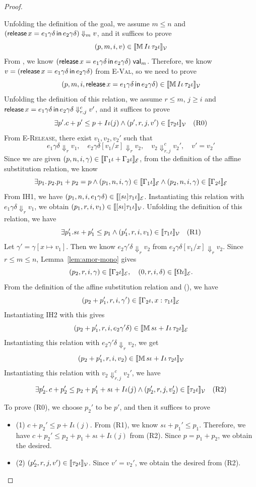 \begin{proof}
\begin{itemize}
Unfolding the definition of the goal, we assume $m\leq n$ and $(\mathsf{release}\, x = e_1\gamma\delta \, \mathsf{in}\, e_2\gamma\delta) \Downarrow_m v$, and it suffices to prove
\[(p, m, i, v) \in \llbracket \mathbb{M}\,{I\iota}\, \tau_2 \iota \rrbracket_{\mathcal{V}} \]
From , we know $(\mathsf{release}\, x = e_1\gamma\delta \, \mathsf{in}\, e_2\gamma\delta)\;\mathsf{val}_{m}$.
Therefore, we know $v= (\mathsf{release}\, x = e_1\gamma\delta \, \mathsf{in}\, e_2\gamma\delta)$ from \textsc{E-Val}, so we need to prove 
\[
(p, m, i, \mathsf{release}\, x = e_1\gamma\delta \, \mathsf{in}\, e_2\gamma\delta) \in \llbracket \mathbb{M}\,{I\iota}\, \tau_2\iota \rrbracket_{\mathcal{V}}
\]
Unfolding the definition of this relation, we assume $r \leq m$, $j\ge i$ and $\mathsf{release}\, x = e_1\gamma\delta \, \mathsf{in}\, e_2\gamma\delta \Downarrow^{c}_{r, j} v'$, and it suffices to prove
\[\exists p'. c+p' \leq p+I\iota(j) \land (p', r, j, v') \in \llbracket {\tau_2\iota} \rrbracket_{\mathcal{V}} \quad (\text{R0})\]
From \textsc{E-Release}, there exist $v_1, v_2, v_2'$ such that 
\[e_1\gamma\delta \Downarrow_r v_1, \quad e_2\gamma\delta[v_1/x] \Downarrow_r v_2, \quad v_2 \Downarrow^c_{r,j} v_2',
\quad v' = v_2'\]
Since we are given $(p,n,i, \gamma) \in \llbracket \Gamma_1\iota + \Gamma_2\iota \rrbracket_{\mathcal{E}}$, from the definition of the affine substitution relation, we know 
\[ \exists p_1.\, p_2. p_1+p_2 = p \land (p_1,n,i, \gamma) \in \llbracket \Gamma_1\iota \rrbracket_{\mathcal{E}} \land (p_2,n,i, \gamma) \in \llbracket \Gamma_2\iota \rrbracket_{\mathcal{E}}\]
From IH1, we have $(p_1, n, i, e_1\gamma\delta) \in \llbracket [s\iota]\tau_1\iota \rrbracket_{\mathcal{E}}$. Instantiating this relation with $e_1\gamma\delta \Downarrow_r v_1$, we obtain $(p_1,r,i,v_1) \in \llbracket [s\iota]\tau_1\iota \rrbracket_{\mathcal{V}}$.
Unfolding the definition of this relation, we have 
\[\exists p_1'. s\iota + p_1' \leq p_1 \land (p_1', r, i, v_1) \in \llbracket \tau_1\iota \rrbracket_{\mathcal{V}} \quad (\text{R1})\]
Let $\gamma' = \gamma[x\mapsto v_1]$. Then we know $e_2\gamma'\delta \Downarrow_r v_2$ from $e_2\gamma\delta[v_1/x] \Downarrow_r v_2$.
Since $r \leq m \leq n$, Lemma~\ref{lem:amor-mono} gives
\[(p_2, r, i, \gamma)\in\llbracket \Gamma_2\iota \rrbracket_{\mathcal{E}}, \quad (0, r, i, \delta)\in\llbracket \Omega\iota \rrbracket_{\mathcal{E}}.\]
From the definition of the affine substitution relation and (), we have 
\[(p_2+p_1', r, i, \gamma') \in \llbracket \Gamma_2\iota, x:\tau_1\iota \rrbracket_{\mathcal{E}}\]
Instantiating IH2 with this gives
\[(p_2+p_1', r, i, e_2\gamma'\delta) \in \llbracket \mathbb{M}\,{s\iota+I\iota}\, \tau_2\iota \rrbracket_{\mathcal{E}}\]
Instantiating this relation with $e_2\gamma'\delta \Downarrow_r v_2$, we get 
\[(p_2+p_1', r, i, v_2) \in \llbracket \mathbb{M}\,{s\iota+I\iota}\, \tau_2\iota \rrbracket_{\mathcal{V}}\]
Instantiating this relation with $v_2 \Downarrow^c_{r,j} v_2'$, we have 
\[\exists p_2'.\,c+p_2' \leq p_2+p_1'+ s\iota + I\iota(j) \land (p_2', r, j, v_2') \in \llbracket \tau_2\iota \rrbracket_{\mathcal{V}} \quad (\text{R2})\]

To prove (R0), we choose $p_2'$ to be $p'$, and then it suffices to prove 
\begin{itemize}
  \item (1) $c+p_2' \leq p+I\iota(j)$.
  From (R1), we know $s\iota + p_1' \leq p_1$. 
  Therefore, we have $c+p_2' \leq p_2+p_1 +s\iota +I\iota(j)$ from (R2).
  Since $p=p_1+p_2$, we obtain the desired.
  \item (2) $(p_2', r, j, v') \in \llbracket {\tau_2\iota} \rrbracket_{\mathcal{V}}$.
  Since $v' = v_2'$, we obtain the desired from (R2).
\qedhere
\end{itemize}
\end{itemize}
\end{proof}


